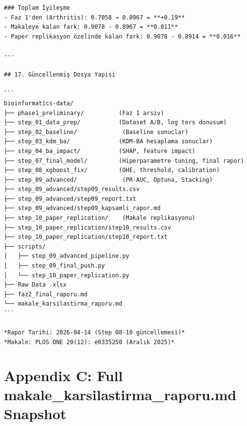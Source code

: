 ﻿\documentclass[11pt,a4paper]{article}
\begin{document}
\begin{verbatim}
### Toplam İyileşme
- Faz 1'den (Arthritis): 0.7058 → 0.8967 = **+0.19**
- Makaleye kalan fark: 0.9078 - 0.8967 = **0.011**
- Paper replikasyon özelinde kalan fark: 0.9078 - 0.8914 = **0.016**

---

## 17. Güncellenmiş Dosya Yapisi

```
bioinformatics-data/
├── phase1_preliminary/          (Faz 1 arsiv)
├── step_01_data_prep/           (Dataset A/B, log ters donusum)
├── step_02_baseline/             (Baseline sonuclar)
├── step_03_kdm_ba/              (KDM-BA hesaplama sonuclar)
├── step_04_ba_impact/           (SHAP, feature impact)
├── step_07_final_model/         (Hiperparametre tuning, final rapor)
├── step_08_xgboost_fix/         (OHE, threshold, calibration)
├── step_09_advanced/             (PR-AUC, Optuna, Stacking)
├── step_09_advanced/step09_results.csv
├── step_09_advanced/step09_report.txt
├── step_09_advanced/step09_kapsamli_rapor.md
├── step_10_paper_replication/    (Makale replikasyonu)
├── step_10_paper_replication/step10_results.csv
├── step_10_paper_replication/step10_report.txt
├── scripts/
│   ├── step_09_advanced_pipeline.py
│   ├── step_09_final_push.py
│   └── step_10_paper_replication.py
├── Raw Data .xlsx
├── faz2_final_raporu.md
└── makale_karsilastirma_raporu.md
```

*Rapor Tarihi: 2026-04-14 (Step 08-10 güncellemesi)*
*Makale: PLOS ONE 20(12): e0335250 (Aralık 2025)*
\end{verbatim}

\newpage
\section{Appendix C: Full makale\_karsilastirma\_raporu.md Snapshot}
\end{document}
